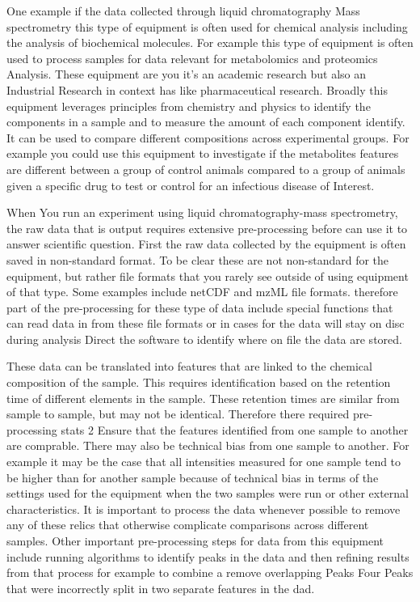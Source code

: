 \documentclass[]{tufte-book}
\begin{document}
One example if the data collected through liquid chromatography Mass spectrometry this type of equipment is often used for chemical analysis including the analysis of biochemical molecules. For example this type of equipment is often used to process samples for data relevant for metabolomics and proteomics Analysis. These equipment are you it's an academic research but also an Industrial Research in context has like pharmaceutical research. Broadly this equipment leverages principles from chemistry and physics to identify the components in a sample and to measure the amount of each component identify. It can be used to compare different compositions across experimental groups. For example you could use this equipment to investigate if the metabolites features are different between a group of control animals compared to a group of animals given a specific drug to test or control for an infectious disease of Interest.

When You run an experiment using liquid chromatography-mass spectrometry, the raw data that is output requires extensive pre-processing before can use it to answer scientific question. First the raw data collected by the equipment is often saved in non-standard format. To be clear these are not non-standard for the equipment, but rather file formats that you rarely see outside of using equipment of that type. Some examples include netCDF and mzML file formats. therefore part of the pre-processing for these type of data include special functions that can read data in from these file formats or in cases for the data will stay on disc during analysis Direct the software to identify where on file the data are stored.

These data can be translated into features that are linked to the chemical composition of the sample. This requires identification based on the retention time of different elements in the sample. These retention times are similar from sample to sample, but may not be identical. Therefore there required pre-processing stats 2 Ensure that the features identified from one sample to another are comprable. There may also be technical bias from one sample to another. For example it may be the case that all intensities measured for one sample tend to be higher than for another sample because of technical bias in terms of the settings used for the equipment when the two samples were run or other external characteristics. It is important to process the data whenever possible to remove any of these relics that otherwise complicate comparisons across different samples. Other important pre-processing steps for data from this equipment include running algorithms to identify peaks in the data and then refining results from that process for example to combine a remove overlapping Peaks Four Peaks that were incorrectly split in two separate features in the dad.
\end{document}
